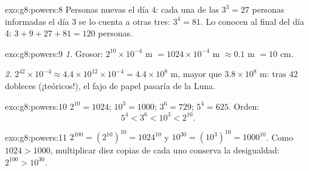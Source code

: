 \begin{solution}{exo:g8:powers:8}
Personas nuevas el día $4$: cada una de las $3^3 = 27$ personas informadas el día
3 se lo cuenta a otras tres: $3^4 = 81$. Lo conocen al final del día 4:
$3 + 9 + 27 + 81 = 120$ personas.
\end{solution}

\begin{solution}{exo:g8:powers:9}
\emph{1.} Grosor: $2^{10} \times 10^{-4}$ m
$= 1024 \times 10^{-4}$ m $\approx 0.1$ m $= 10$ cm.

\emph{2.} $2^{42} \times 10^{-4} \approx 4.4 \times 10^{12} \times
10^{-4} = 4.4 \times 10^8$ m, mayor que $3.8 \times 10^8$ m: tras
$42$ dobleces (¡teóricos!), el fajo de papel pasaría de la Luna.
\end{solution}

\begin{solution}{exo:g8:powers:10}
$2^{10} = 1024$; $10^3 = 1000$; $3^6 = 729$; $5^4 = 625$. Orden:
\[
5^4 < 3^6 < 10^3 < 2^{10} .
\]
\end{solution}

\begin{solution}{exo:g8:powers:11}
$2^{100} = \left(2^{10}\right)^{10} = 1024^{10}$ y
$10^{30} = \left(10^3\right)^{10} = 1000^{10}$. Como $1024 > 1000$,
multiplicar diez copias de cada uno conserva la desigualdad:
$2^{100} > 10^{30}$.
\end{solution}

